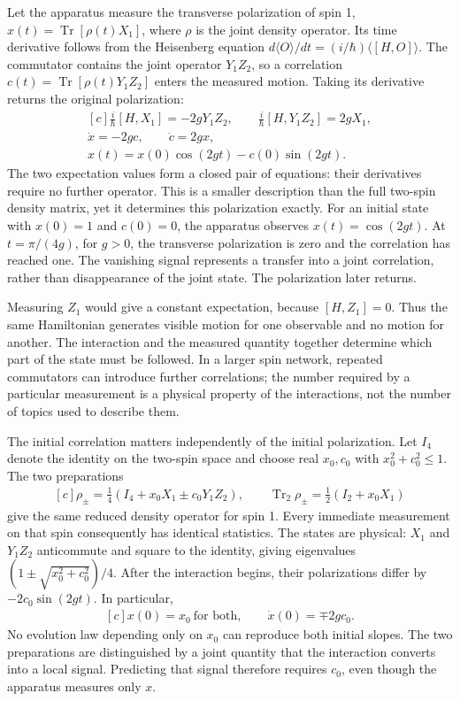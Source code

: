 \documentclass[11pt,oneside]{book}
\newenvironment{centeredalign}{\[\begin{gathered}[c]}{\end{gathered}\]}
\begin{document}
Let the apparatus measure the transverse polarization of spin 1,
\(x(t)=\operatorname{Tr}[\rho(t)X_1]\), where \(\rho\) is the joint
density operator. Its time derivative follows from the Heisenberg
equation \(d\langle O\rangle/dt=(i/\hbar)\langle[H,O]\rangle\).
The commutator contains the joint operator \(Y_1Z_2\), so a correlation
\(c(t)=\operatorname{Tr}[\rho(t)Y_1Z_2]\) enters the measured motion.
Taking its derivative returns the original polarization:
\begin{centeredalign}
\frac{i}{\hbar}[H,X_1]=-2gY_1Z_2,\qquad
\frac{i}{\hbar}[H,Y_1Z_2]=2gX_1,\\
\dot x=-2gc,\qquad \dot c=2gx,\\
x(t)=x(0)\cos(2gt)-c(0)\sin(2gt).
\end{centeredalign}
The two expectation values form a closed pair of equations: their
derivatives require no further operator. This is a smaller description
than the full two-spin density matrix, yet it determines this
polarization exactly. For an initial state with \(x(0)=1\) and
\(c(0)=0\), the apparatus observes \(x(t)=\cos(2gt)\). At
\(t=\pi/(4g)\), for \(g>0\), the transverse polarization is zero
and the correlation has reached one. The vanishing signal represents
a transfer into a joint correlation, rather than disappearance of the
joint state. The polarization later returns.

Measuring \(Z_1\) would give a constant expectation, because
\([H,Z_1]=0\). Thus the same Hamiltonian generates visible motion
for one observable and no motion for another. The interaction and
the measured quantity together determine which part of the state
must be followed. In a larger spin network, repeated commutators
can introduce further correlations; the number required by a
particular measurement is a physical property of the interactions,
not the number of topics used to describe them.

The initial correlation matters independently of the initial
polarization. Let \(I_4\) denote the identity on the two-spin space
and choose real \(x_0,c_0\) with \(x_0^2+c_0^2\leq1\). The two
preparations
\begin{centeredalign}
\rho_\pm=\tfrac14(I_4+x_0X_1\pm c_0Y_1Z_2),\qquad
\operatorname{Tr}_2\rho_\pm=\tfrac12(I_2+x_0X_1)
\end{centeredalign}
give the same reduced density operator for spin 1. Every immediate
measurement on that spin consequently has identical statistics.
The states are physical: \(X_1\) and \(Y_1Z_2\) anticommute and
square to the identity, giving eigenvalues
\((1\pm\sqrt{x_0^2+c_0^2})/4\). After the interaction begins,
their polarizations differ by \(-2c_0\sin(2gt)\). In particular,
\begin{centeredalign}
x(0)=x_0\ \text{for both},\qquad \dot x(0)=\mp2gc_0.
\end{centeredalign}
No evolution law depending only on \(x_0\) can reproduce both initial slopes.
The two preparations are distinguished by a joint quantity that the
interaction converts into a local signal. Predicting that signal therefore
requires \(c_0\), even though the apparatus measures only \(x\).
\end{document}
